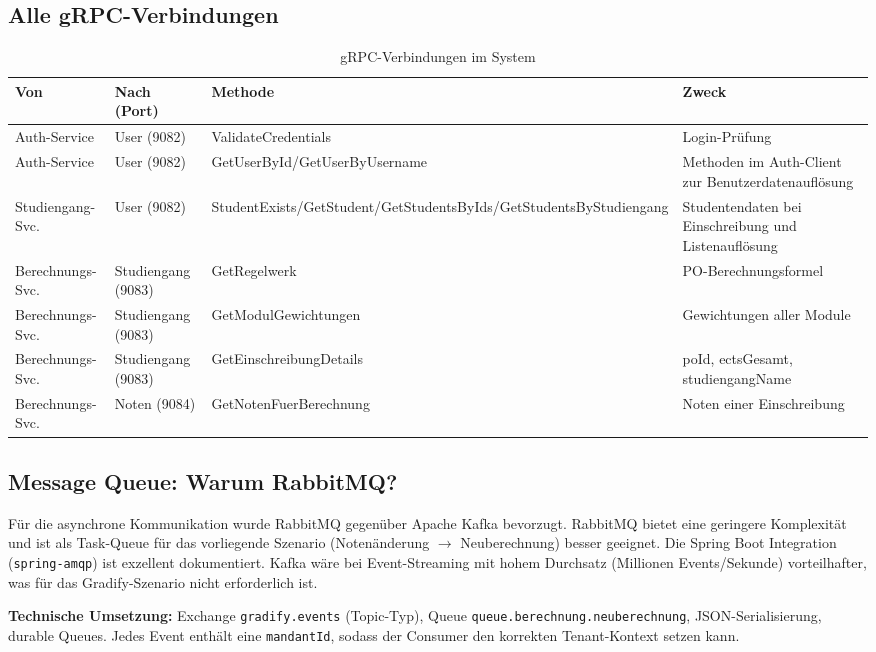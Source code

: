 \documentclass[12pt,a4paper,ngerman]{article}
\begin{document}
\subsection{Alle gRPC-Verbindungen}

\begin{table}[H]
\centering
\caption{gRPC-Verbindungen im System}
\begin{tabular}{llll}
\toprule
\textbf{Von} & \textbf{Nach (Port)} & \textbf{Methode} & \textbf{Zweck} \\
\midrule
Auth-Service      & User (9082)        & ValidateCredentials      & Login-Prüfung \\
Auth-Service      & User (9082)        & GetUserById/GetUserByUsername & Methoden im Auth-Client zur Benutzerdatenauflösung \\
Studiengang-Svc.  & User (9082)        & StudentExists/GetStudent/GetStudentsByIds/GetStudentsByStudiengang & Studentendaten bei Einschreibung und Listenauflösung \\
Berechnungs-Svc.  & Studiengang (9083) & GetRegelwerk             & PO-Berechnungsformel \\
Berechnungs-Svc.  & Studiengang (9083) & GetModulGewichtungen     & Gewichtungen aller Module \\
Berechnungs-Svc.  & Studiengang (9083) & GetEinschreibungDetails  & poId, ectsGesamt, studiengangName \\
Berechnungs-Svc.  & Noten (9084)       & GetNotenFuerBerechnung   & Noten einer Einschreibung \\
\bottomrule
\end{tabular}
\end{table}

\subsection{Message Queue: Warum RabbitMQ?}

Für die asynchrone Kommunikation wurde RabbitMQ gegenüber Apache Kafka bevorzugt. RabbitMQ bietet eine geringere Komplexität und ist als Task-Queue für das vorliegende Szenario (Notenänderung $\rightarrow$ Neuberechnung) besser geeignet. Die Spring Boot Integration (\texttt{spring-amqp}) ist exzellent dokumentiert. Kafka wäre bei Event-Streaming mit hohem Durchsatz (Millionen Events/Sekunde) vorteilhafter, was für das Gradify-Szenario nicht erforderlich ist.

\textbf{Technische Umsetzung:} Exchange \texttt{gradify.events} (Topic-Typ), Queue \texttt{queue.berechnung.neuberechnung}, JSON-Serialisierung, durable Queues. Jedes Event enthält eine \texttt{mandantId}, sodass der Consumer den korrekten Tenant-Kontext setzen kann.
\end{document}
